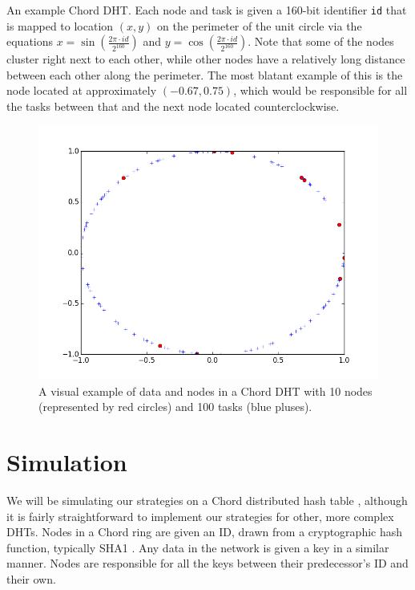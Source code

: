 An example Chord DHT.
Each node and task is given a 160-bit identifier \texttt{id} that is mapped to location $ (x,y) $ on the perimeter of the unit circle via the equations $ x = \sin\left( \frac{ 2 \pi \cdot id}{2^{160}} \right)$ and $ y = \cos\left( \frac{ 2 \pi \cdot id}{2^{160}} \right)$. 
Note that some of the nodes cluster right next to each other, while other nodes have a relatively long distance between each other along the perimeter.  
The most blatant example of this is the node located at approximately $(-0.67, 0.75)$, which would be responsible for all the tasks between that and the next node located counterclockwise.

\begin{figure}
\centering
\includegraphics[width=0.7\linewidth]{figs/exampleChordDistribution}
\caption[Distribution of Nodes and Tasks in a Chiord DHT]{A visual example of data and nodes in a Chord DHT with 10 nodes (represented by red circles) and 100 tasks (blue pluses).  }
\label{fig:exampleChordDistribution}
\end{figure}



\section{Simulation}
\label{sec:auto-simulation}



We will be simulating our strategies on a Chord distributed hash table \cite{chord}, although it is fairly straightforward to implement our strategies for other, more complex DHTs.
Nodes in a Chord ring are given an ID, drawn from a cryptographic hash function, typically SHA1 \cite{sha1}.
Any data in the network is given a key in a similar manner.
Nodes are responsible for all the keys between their predecessor's ID and their own.

